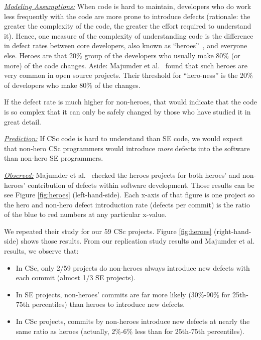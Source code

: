 \documentclass[conference,10pt]{IEEEtran}
\newcommand{\bi}{\begin{itemize}}
\newcommand{\ei}{\end{itemize}}
\begin{document}
\noindent \textit{\underline{Modeling Assumptions:}} 
When code is hard to maintain,
developers who do work less frequently with the code are more prone to introduce defects
(rationale: the greater the complexity of the code, the greater the effort required to understand it).
Hence, one measure of the complexity of understanding code
is the difference in defect rates between core developers, also known as ``heroes''~\cite{agrawal2018we, goeminne2011evidence, torres2011analysis, robles2009evolution}, and everyone else.
Heroes are that  20\% group of the developers who usually make 80\% (or more) of the code changes. Aside:   Majumder et al.~\cite{majumder19_heroes} found that such heroes are very common in open source projects. Their threshold for ``hero-ness'' is the 20\% of developers
who make 80\% of the changes. 

If the defect rate is much higher for non-heroes, that would
indicate that the code is so complex that it can only
be safely changed by those who have studied it in great detail.


\noindent \textit{\underline{Prediction:}} If CSc code is hard to understand than SE code, we would expect that non-hero CSc programmers would
introduce {\em more} defects into the software than non-hero SE programmers. 




\noindent \textit{\underline{Observed:}} Majumder et al.~\cite{majumder19_heroes} checked the heroes projects for both heroes' and non-heroes' contribution of defects within software development. Those
results can be see Figure \ref{fig:heroes} (left-hand-side). Each x-axis of that figure is one project so the hero and non-hero defect introduction rate (defects per commit) is the ratio of the blue to red numbers
at any particular x-value.




We repeated their study for our 59 CSc projects.  Figure \ref{fig:heroes} (right-hand-side)
shows those results. 
From our replication study results and Majumder et al.  results, we observe that:
\bi
\item In CSc, only 2/59 projects do non-heroes always introduce new defects with each commit (almost 1/3 SE projects).
\item In SE projects, non-heroes' commits are far more likely (30\%-90\% for 25th-75th percentiles) than heroes to introduce new defects.
\item In CSc projects, commits by non-heroes introduce new defects at nearly the same ratio as heroes (actually, 2\%-6\% less than for 25th-75th percentiles).
\ei
 
\end{document}
